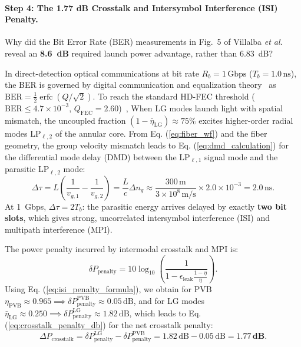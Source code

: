 \documentclass{optica-article}
\begin{document}
\paragraph{Step 4: The 1.77 dB Crosstalk and Intersymbol Interference (ISI) Penalty.}
Why did the Bit Error Rate (BER) measurements in Fig.~5 of Villalba \emph{et al.}~\cite{Villalba2023} reveal an \textbf{8.6~dB} required launch power advantage, rather than 6.83~dB?

In direct-detection optical communications at bit rate $R_b = 1\,\text{Gbps}$ ($T_b = 1.0\,\text{ns}$), the BER is governed by digital communication and equalization theory~\cite{Proakis2008} as $\text{BER} = \frac{1}{2} \operatorname{erfc}(Q / \sqrt{2})$. To reach the standard HD-FEC threshold ($\text{BER} \le 4.7 \times 10^{-3}$, $Q_{\text{FEC}} = 2.60$)~\cite{ITUTG9751}, When LG modes launch light with spatial mismatch, the uncoupled fraction $(1 - \bar{\eta}_{\text{LG}}) \approx 75\%$ excites higher-order radial modes LP$_{\ell, 2}$ of the annular core. From Eq. (\ref{eq:fiber_wf}) and the fiber geometry, the group velocity mismatch leads to Eq. (\ref{eq:dmd_calculation}) for the differential mode delay (DMD) between the LP$_{\ell, 1}$ signal mode and the parasitic LP$_{\ell, 2}$ mode:
\begin{equation}
\Delta \tau = L \left( \frac{1}{v_{g, 1}} - \frac{1}{v_{g, 2}} \right) = \frac{L}{c} \Delta n_g \approx \frac{300\,\text{m}}{3 \times 10^8\,\text{m/s}} \times 2.0 \times 10^{-3} = 2.0\,\text{ns}.
\label{eq:dmd_calculation}
\end{equation}
At 1~Gbps, $\Delta \tau = 2 T_b$: the parasitic energy arrives delayed by exactly \textbf{two bit slots}, which gives strong, uncorrelated intersymbol interference (ISI) and multipath interference (MPI).

The power penalty incurred by intermodal crosstalk and MPI is:
\begin{equation}
\delta P_{\text{penalty}} = 10 \log_{10}\left( \frac{1}{1 - \epsilon_{\text{leak}} \frac{1 - \eta}{\eta}} \right).
\label{eq:isi_penalty_formula}
\end{equation}
Using Eq. (\ref{eq:isi_penalty_formula}), we obtain for PVB $\eta_{\text{PVB}} \approx 0.965 \implies \delta P_{\text{penalty}}^{\text{PVB}} \approx 0.05\,\text{dB}$, and for LG modes $\bar{\eta}_{\text{LG}} \approx 0.250 \implies \delta P_{\text{penalty}}^{\text{LG}} \approx 1.82\,\text{dB}$, which leads to Eq. (\ref{eq:crosstalk_penalty_db}) for the net crosstalk penalty:
\begin{equation}
\Delta P_{\text{crosstalk}} = \delta P_{\text{penalty}}^{\text{LG}} - \delta P_{\text{penalty}}^{\text{PVB}} = 1.82\,\text{dB} - 0.05\,\text{dB} = \mathbf{1.77\,\text{dB}}.
\label{eq:crosstalk_penalty_db}
\end{equation}
\end{document}
